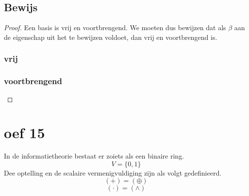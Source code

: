\documentclass[lineaire_algebra_oplossingen.tex]{subfiles}
\begin{document}
\subsection*{Bewijs}
\begin{proof}
Een basis is vrij en voortbrengend. We moeten dus bewijzen dat als $\beta$ aan de eigenschap uit het te bewijzen voldoet, dan vrij en voortbrengend is.
\subsubsection*{vrij}

\subsubsection*{voortbrengend}

\end{proof}

\section{oef 15}
In de informatietheorie bestaat er zoiets als een binaire ring.
\[
V = \{0,1\}
\]
Dee optelling en de scalaire vermenigvuldiging zijn als volgt gedefinieerd.
\[
(+) = (\oplus)
\]
\[
(\cdot) = (\wedge)
\]
\end{document}
